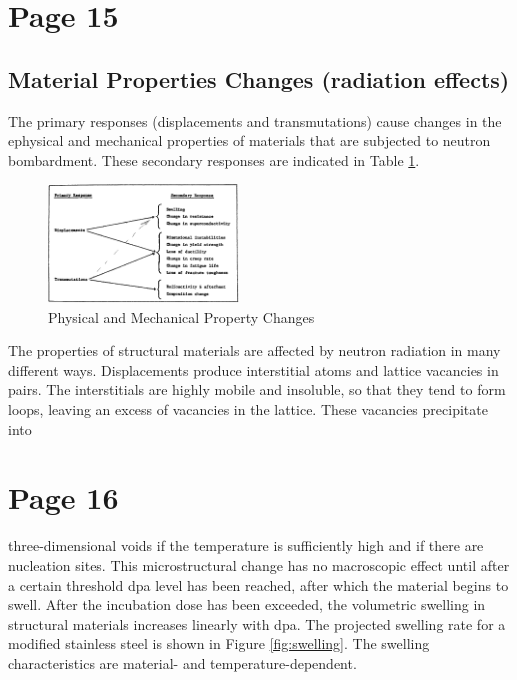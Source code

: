 \documentclass[11pt]{report} %
\begin{document}
\section{Page 15}
\subsection{Material Properties Changes (radiation effects)}
The primary responses (displacements and transmutations) cause changes in the ephysical and mechanical properties of materials that are subjected to neutron bombardment. These secondary responses are indicated in Table \ref{fig:table2}.


\begin{figure}[h!]
  \centering
  \includegraphics[width=0.45\textwidth]{tables/table2.png}
  \caption{Physical and Mechanical Property Changes}
  \label{fig:table2}
\end{figure}

The properties of structural materials are affected by neutron radiation in many different ways. Displacements produce interstitial atoms and lattice vacancies in pairs. The interstitials are highly mobile and insoluble, so that they tend to form loops, leaving an excess of vacancies in the lattice. These vacancies precipitate into 

\section{Page 16}
three-dimensional voids if the temperature is sufficiently high and if there are nucleation sites. This microstructural change has no macroscopic effect until after a certain threshold dpa level has been reached, after which the material begins to swell. After the incubation dose has been exceeded, the volumetric swelling in structural materials increases linearly with dpa. The projected swelling rate for a modified stainless steel is shown in Figure \ref{fig:swelling}. The swelling characteristics are material- and temperature-dependent.
\end{document}
